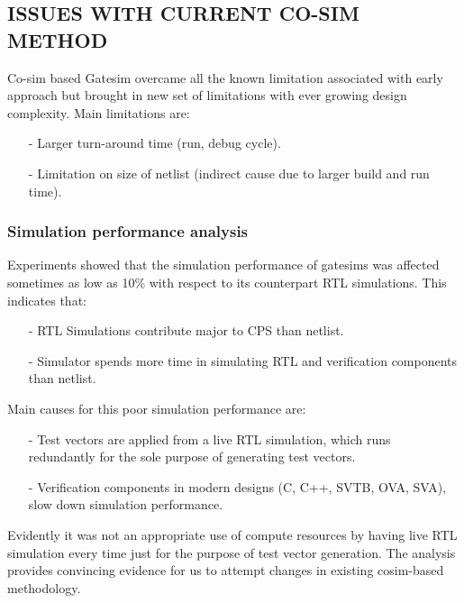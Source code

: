 \subsection {ISSUES WITH CURRENT CO-SIM METHOD}

Co-sim based Gatesim overcame all the known limitation associated with early approach but brought in new set of limitations with ever growing design complexity. Main limitations are:

\begin{itemize}
	\item[-]Larger turn-around time (run, debug cycle).
	\item[-]Limitation on size of netlist (indirect cause due to larger build and run time).
\end{itemize}

\subsubsection {Simulation performance analysis}
Experiments showed that the simulation performance of gatesims was affected sometimes as low as 10\% with respect to its counterpart RTL simulations. This indicates that:

\begin{itemize}
	\item[-]RTL Simulations contribute major to CPS than netlist.
	\item[-]Simulator spends more time in simulating RTL and verification components than netlist.
\end{itemize}

Main causes for this poor simulation performance are:

\begin{itemize}
	\item[-]Test vectors are applied from a live RTL simulation, which runs redundantly for the sole purpose of generating test vectors.
	\item[-]Verification components in modern designs (C, C++, SVTB, OVA, SVA), slow down simulation performance.
\end{itemize}

Evidently it was not an appropriate use of compute resources by having live RTL simulation every time just for the purpose of test vector generation. The analysis provides convincing evidence for us to attempt changes in existing cosim-based methodology.
